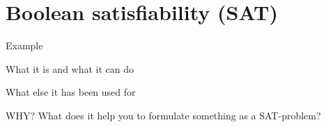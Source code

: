 \section{Boolean satisfiability (SAT)}

Example

What it is and what it can do

What else it has been used for


WHY? What does it help you to formulate something as a SAT-problem?